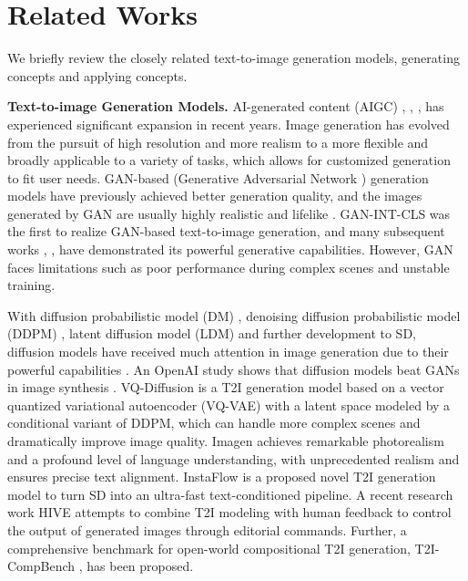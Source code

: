 \section{Related Works}
We briefly review the closely related text-to-image generation models, generating concepts and applying concepts.

\textbf{Text-to-image Generation Models.} AI-generated content (AIGC) \cite{cao2023comprehensive}, \cite{xu2024unleashing}, \cite{wang2023security}, \cite{10230895} has experienced significant expansion in recent years. Image generation has evolved from the pursuit of high resolution and more realism to a more flexible and broadly applicable to a variety of tasks, which allows for customized generation to fit user needs. GAN-based (Generative Adversarial Network \cite{goodfellow2014generative}) generation models have previously achieved better generation quality, and the images generated by GAN are usually highly realistic and lifelike \cite{10.1145/3439723}. GAN-INT-CLS \cite{reed2016generative} was the first to realize GAN-based text-to-image generation, and many subsequent works \cite{Cheng9156682}, \cite{Huang2021Unifying}, \cite{Ruan9710042} have demonstrated its powerful generative capabilities. However, GAN faces limitations such as poor performance during complex scenes and unstable training.

With diffusion probabilistic model (DM) \cite{pmlr-v37-sohl-dickstein15}, denoising diffusion probabilistic model (DDPM) \cite{NEURIPS2020_4c5bcfec}, latent diffusion model (LDM) \cite{sdpaper} and further development to SD, diffusion models have received much attention in image generation due to their powerful capabilities \cite{Croitoru10081412, Yang2023Diffusion}. An OpenAI study shows that diffusion models beat GANs in image synthesis \cite{NEURIPS2021_49ad23d1}. VQ-Diffusion \cite{Gu9879180} is a T2I generation model based on a vector quantized variational autoencoder (VQ-VAE) with a latent space modeled by a conditional variant of DDPM, which can handle more complex scenes and dramatically improve image quality. Imagen \cite{NEURIPS2022_ec795aea} achieves remarkable photorealism and a profound level of language understanding, with unprecedented realism and ensures precise text alignment. InstaFlow \cite{liu2024instaflow} is a proposed novel T2I generation model to turn SD into an ultra-fast text-conditioned pipeline. A recent research work HIVE \cite{zhang2023hive} attempts to combine T2I modeling with human feedback to control the output of generated images through editorial commands. Further, a comprehensive benchmark for open-world compositional T2I generation, T2I-CompBench \cite{NEURIPS2023_f8ad010c}, has been proposed.

